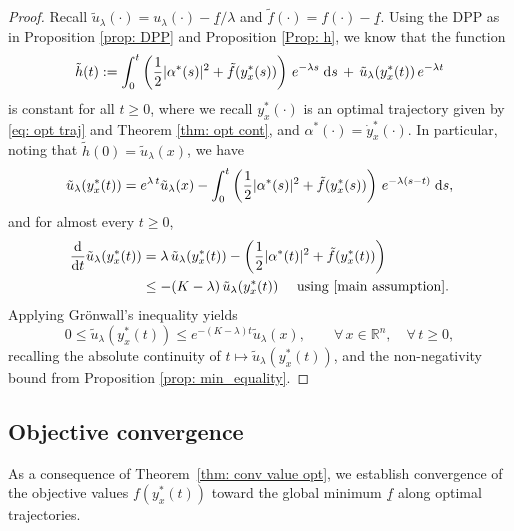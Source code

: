 \documentclass[12pt]{amsart}
\newcommand{\D}[1]{\mbox{\rm #1}}
\newcommand{\dd}{\D{d}}
\numberwithin{equation}{section}
\theoremstyle{plain}
\begin{document}
\begin{proof}
Recall $\tilde{u}_{\lambda}(\cdot) = u_{\lambda}(\cdot) - \underline{f}/\lambda$ and $\tilde{f}(\cdot) = f(\cdot) - \underline{f}$. 
Using the DPP as in Proposition \ref{prop: DPP} and  Proposition \ref{Prop: h}, we know that the function
\begin{equation*}
    \tilde{h}(t) := \int_{0}^{t} \left(\frac{1}{2}|\alpha^{*}(s)|^{2} + \tilde{f}(y_{x}^{*}(s))\right)\, e^{-\lambda s}\;\dd s \, + \, \tilde{u}_{\lambda}(y_{x}^{*}(t))\,e^{-\lambda t}
\end{equation*}
is constant for all $t\geq 0$, where we recall $y_{x}^{*}(\cdot)$ is an optimal trajectory given by \eqref{eq: opt traj} and Theorem \ref{thm: opt cont}, and $\alpha^{*}(\cdot)=\dot{y}_{x}^{*}(\cdot)$. In particular, noting that $\tilde{h}(0)= \tilde{u}_{\lambda}(x)$, we have
\begin{equation*}
    \tilde{u}_{\lambda}(y_{x}^{*}(t)) = e^{\lambda\, t}\tilde{u}_{\lambda}(x) - \int_{0}^{t} \left(\frac{1}{2}|\alpha^{*}(s)|^{2} + \tilde{f}(y_{x}^{*}(s))\right)\, e^{-\lambda (s-t)}\;\dd s ,
\end{equation*}
and for almost every $t\geq 0$,
\begin{equation*}
\begin{aligned}
    \frac{\dd}{\dd t} \tilde{u}_{\lambda}(y_{x}^{*}(t))
    & = \lambda\,\tilde{u}_{\lambda}(y_{x}^{*}(t)) - \left(\frac{1}{2}|\alpha^{*}(t)|^{2} + \tilde{f}(y_{x}^{*}(t))\right)\\
    & \leq -(K-\lambda)\,\tilde{u}_{\lambda}(y_{x}^{*}(t)) \quad \text{ using } \ref{main assumption}.
\end{aligned}
\end{equation*}
Applying Gr\"onwall's inequality yields
\begin{equation*}
    0\leq \tilde{u}_{\lambda}(y_{x}^{*}(t)) \leq e^{-(K-\lambda)t} \tilde{u}_{\lambda}(x),\quad\quad \forall\,x\in\mathbb{R}^{n}, \quad \forall\,t\geq 0,
\end{equation*}
recalling the absolute continuity of $t\mapsto \tilde{u}_{\lambda}(y_{x}^{*}(t))$, and the non-negativity bound from Proposition \ref{prop: min_equality}.
\end{proof}

\subsection{Objective convergence}
As a consequence of Theorem~\ref{thm: conv value opt}, we establish  convergence of the objective values $f(y_x^*(t))$ toward the global minimum $\underline{f}$ along optimal trajectories.
\end{document}
